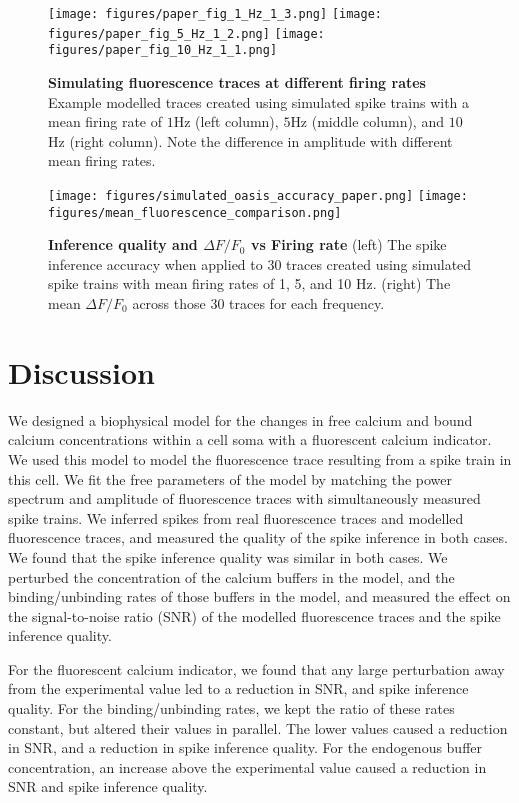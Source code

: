 \documentclass[a4paper,12pt]{article}
\theoremstyle{definition}
\begin{document}
\begin{figure}[h]
  \texttt{[image: figures/paper\_fig\_1\_Hz\_1\_3.png]}
  \texttt{[image: figures/paper\_fig\_5\_Hz\_1\_2.png]}
  \texttt{[image: figures/paper\_fig\_10\_Hz\_1\_1.png]}
  \caption{\textbf{Simulating fluorescence traces at different firing rates } Example modelled traces created using simulated spike trains with a mean firing rate of $1$Hz (left column), $5$Hz (middle column), and $10$Hz (right column). Note the difference in amplitude with different mean firing rates.}
  \label{fig:frequency_comparison_traces}
\end{figure}

\begin{figure}[h]
\centering
  \texttt{[image: figures/simulated\_oasis\_accuracy\_paper.png]}
  \texttt{[image: figures/mean\_fluorescence\_comparison.png]}
  \caption{\textbf{Inference quality and $\Delta F/F_0$ vs Firing rate} (left) The spike inference accuracy when applied to 30 traces created using simulated spike trains with mean firing rates of 1, 5, and 10 Hz. (right) The mean $\Delta F/F_0$ across those 30 traces for each frequency.}
  \label{fig:frequency_comparison_measures}
\end{figure}

\section{Discussion}
We designed a biophysical model for the changes in free calcium and bound calcium concentrations within a cell soma with a fluorescent calcium indicator. We used this model to model the fluorescence trace resulting from a spike train in this cell.  We fit the free parameters of the model by matching the power spectrum and amplitude of fluorescence traces with simultaneously measured spike trains. We inferred spikes from real fluorescence traces and modelled fluorescence traces, and measured the quality of the spike inference in both cases. We found that the spike inference quality was similar in both cases. We perturbed the concentration of the calcium buffers in the model, and the binding/unbinding rates of those buffers in the model, and measured the effect on the signal-to-noise ratio (SNR) of the modelled fluorescence traces and the spike inference quality.

For the fluorescent calcium indicator, we found that any large perturbation away from the experimental value led to a reduction in SNR, and spike inference quality. For the binding/unbinding rates, we kept the ratio of these rates constant, but altered their values in parallel. The lower values caused a reduction in SNR, and a reduction in spike inference quality. For the endogenous buffer concentration, an increase above the experimental value caused a reduction in SNR and spike inference quality.
\end{document}
